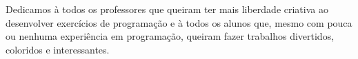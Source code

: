 Dedicamos à todos os professores que queiram ter mais liberdade criativa ao desenvolver exercícios de programação e à todos os alunos que, mesmo com pouca ou nenhuma experiência em programação, queiram fazer trabalhos divertidos, coloridos e interessantes. 